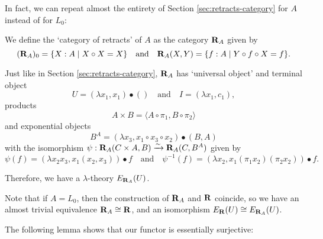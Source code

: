 In fact, we can repeat almost the entirety of Section \ref{sec:retracts-category} for $ A $ instead of for $ L_0 $:
\begin{definition}
  We define the `category of retracts' of $ A $ as the category $ \mathbf{R}_A $ given by
  \[ (\mathbf{R}_A)_0 = \{ X : A \mid X \circ X = X \} \quad \text{and} \quad \mathbf{R}_A(X, Y) = \{ f : A \mid Y \circ f \circ X = f \}. \]
\end{definition}
Just like in Section \ref{sec:retracts-category}, $ \mathbf{R}_A $ has `universal object' and terminal object
\[ U = (\lambda x_1, x_1) \bullet () \quad \text{and} \quad I = (\lambda x_1, c_1), \]
products
\[ A \times B = \langle A \circ \pi_1, B \circ \pi_2 \rangle \]
and exponential objects
\[ B^A = (\lambda x_3, x_1 \circ x_3 \circ x_2) \bullet (B, A) \]
with the isomorphism $ \psi: \mathbf{R}_A(C \times A, B) \xrightarrow \sim \mathbf{R}_A(C, B^A) $
given by
\[ \psi(f) = (\lambda x_2 x_3, x_1 (x_2, x_3)) \bullet f \quad \text{and} \quad \psi^{-1}(f) = (\lambda x_2, x_1 (\pi_1 x_2) (\pi_2 x_2)) \bullet f. \]

Therefore, we have a $ \lambda $-theory $ E_{\mathbf{R}_A}(U) $.

\begin{remark}
  Note that if $ A = L_0 $, then the construction of $ \mathbf{R}_A $ and $ \mathbf{R} $ coincide, so we have an almost trivial equivalence $ \mathbf{R}_A \cong \mathbf{R} $, and an isomorphism $ E_{\mathbf{R}}(U) \cong E_{\mathbf{R}_A}(U) $.
\end{remark}

The following lemma shows that our functor is essentially surjective:

